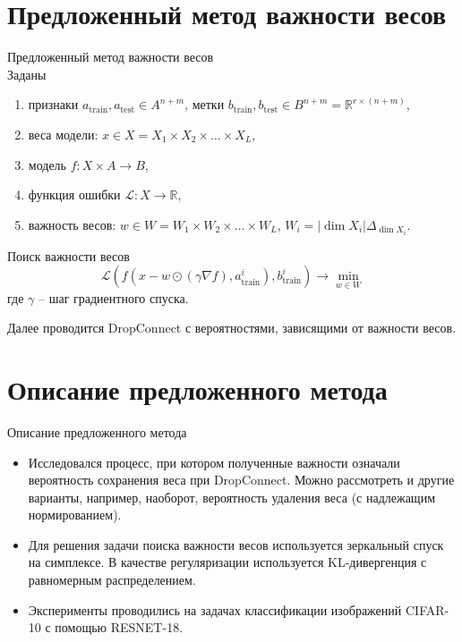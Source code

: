 \documentclass[10pt,pdf,hyperref={unicode}]{beamer}
\begin{document}
\section{Предложенный метод важности весов}
\begin{frame}{Предложенный метод важности весов}
~\\[-1mm]
Заданы
\begin{enumerate}[1)]
    \item признаки $a_\text{train}, a_\text{test} \in A^{n+m}$, метки $b_\text{train}, b_\text{test} \in B^{n+m} = \mathbb{R}^{r \times (n+m)}$,
    \item веса модели: $x \in X = X_1 \times X_2 \times \ldots \times X_L$,
    \item модель $f: X \times A \to B$,
    \item функция ошибки $\mathcal{L}: X \to \mathbb{R}$,
    \item важность весов: $w \in W = W_1 \times W_2 \times \ldots \times W_L$, $ W_i = |\dim X_i |\Delta_{\dim X_i}$.
\end{enumerate}

\bigskip

Поиск важности весов
\[
	\mathcal{L}(f(x -  w \odot (\gamma \nabla f), a_\text{train}^i), b_\text{train}^i) \to \min_{w \in W}
\]
где $\gamma$ -- шаг градиентного спуска.

\bigskip

Далее проводится DropConnect с вероятностями, зависящими от важности весов.

\cite{keshari2019guided}
\end{frame}

\section{Описание предложенного метода}
\begin{frame}{Описание предложенного метода}
\justifying
\begin{itemize}
\item Исследовался процесс, при котором полученные важности означали вероятность сохранения веса при DropConnect. Можно рассмотреть и другие варианты, например, наоборот, вероятность удаления веса (с надлежащим нормированием).
\item Для решения задачи поиска важности весов используется зеркальный спуск на симплексе. В качестве регуляризации используется KL-дивергенция с равномерным распределением.
\item  Эксперименты проводились на задачах классификации изображений CIFAR-10 с помощью RESNET-18.
\end{itemize}

\end{frame}
\end{document}
